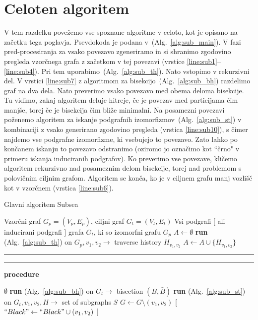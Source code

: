 \documentclass[a4paper, 12pt, ]{book}
\newcommand\Subalg[1]{%
	\Statex%
	\vspace*{-.7\baselineskip}%
	\hspace*{\dimexpr-\algorithmicindent-4pt\relax}%
	\rule{\textwidth}{0.4pt}%
	\Statex%
	
	\vspace*{-.7\baselineskip}%
	\Statex\hspace*{\dimexpr-\algorithmicindent-2pt\relax}%
	\rule{\textwidth}{0.4pt}%
	
	\Statex\hspace*{-\algorithmicindent}\textbf{procedure} #1%
}
\newcommand{\refalg}[1]{(Alg.~\ref{#1})}
\begin{document}
	\section {Celoten algoritem}
	\label{sub:subsea}
	V tem razdelku povežemo vse spoznane algoritme v celoto, kot je opisano na začetku tega poglavja. Psevdokoda je podana v~\refalg{alg:sub_main}.
	V fazi pred-procesiranja za vsako povezavo zgeneriramo in si shranimo zgodovino pregleda vzorčnega grafa z začetkom v tej povezavi (vrstice
	\ref{line:sub1}--\ref{line:sub4}). Pri tem uporabimo~\refalg{alg:sub_th}. Nato vstopimo v rekurzivni del. V vrstici \ref{line:sub7} z algoritmom za 
	bisekcijo~\refalg{alg:sub_bh} razdelimo graf na dva dela. Nato preverimo vsako povezavo med obema deloma bisekcije. Tu vidimo, zakaj algoritem
	deluje hitreje, če je povezav med particijama čim manjše, torej če je bisekcija čim bliže minimalni. Na posamezni povezavi poženemo algoritem
	za iskanje podgrafnih izomorfizmov~\refalg{alg:sub_st} v kombinaciji z vsako generirano zgodovino pregleda (vrstica \ref{line:sub10}), s čimer najdemo
	vse podgrafne izomorfizme, ki vsebujejo to povezavo. Zato lahko po končanem iskanju to povezavo odstranimo (oziromo jo označimo kot ``črno" v
	primeru iskanja induciranih podgrafov). Ko preverimo vse povezave, kličemo algoritem rekurzivno nad posameznim delom bisekcije, torej nad problemom
	s polovičnim ciljnim grafom. Algoritem se konča, ko je v ciljnem grafu manj vozlišč kot v vzorčnem (vrstica \ref{line:sub6}).
	
\begin{algorithm}
\caption{Glavni algoritem Subsea}
\label{alg:sub_main}
\begin{algorithmic}[1]
	\Require Vzorčni graf $G_p = (V_p, E_p)$, ciljni graf $G_t = (V_t, E_t)$
	\Ensure Vsi podgrafi [ ali inducirani podgrafi ] grafa $G_t$, ki so izomorfni grafu $G_p$	
	 \State $A \gets \emptyset$						\label{line:sub1}
	 	\State \textbf{run} \refalg{alg:sub_th} on $G_p, v_1, v_2 \to $ traverse history $H_{v_1, v_2}$
	 	\State $A \gets A \cup \{ H_{v_1, v_2} \}$		\label{line:sub4}
	 \EndFor
	 \State {}

	
	\Subalg{\Call{SubIso}{$A, G_t$}}
		\Return $\emptyset$			\label{line:sub6}
	\EndIf
	\State \textbf{run} \refalg{alg:sub_bh} on $G_t \to$ bisection $(B, \bar B)$		\label{line:sub7}
			\State \textbf{run} \refalg{alg:sub_st} on $G_t, v_1, v_2, H \to $ set of subgraphs $S$	\label{line:sub10}
			\State $G \gets G \setminus (v_1, v_2)$ [ $``Black" \gets ``Black" \cup (v_1, v_2)$ ]
		\EndFor
	\EndFor
	\State {}
			
\end{algorithmic}
\end{algorithm}
\end{document}
